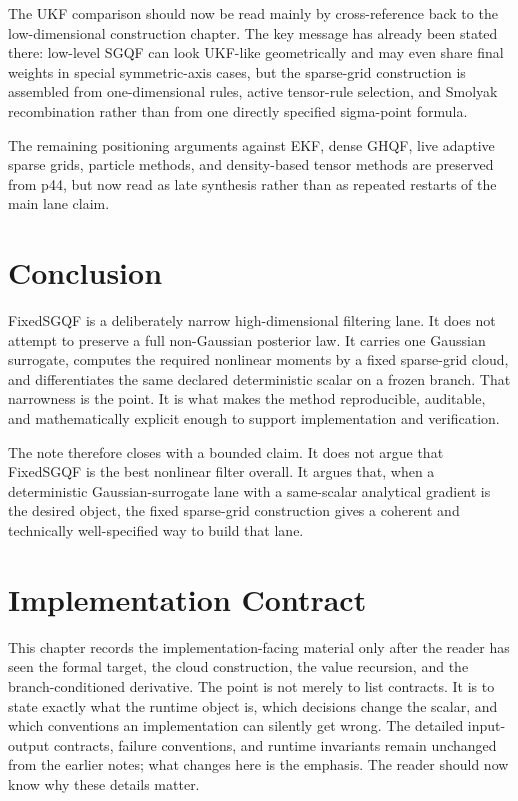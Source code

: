 \documentclass[11pt]{article}
\numberwithin{equation}{section}
\begin{document}
The UKF comparison should now be read mainly by cross-reference back to the
low-dimensional construction chapter.  The key message has already been stated
there: low-level SGQF can look UKF-like geometrically and may even share final
weights in special symmetric-axis cases, but the sparse-grid construction is
assembled from one-dimensional rules, active tensor-rule selection, and Smolyak
recombination rather than from one directly specified sigma-point formula.

The remaining positioning arguments against EKF, dense GHQF, live adaptive sparse
grids, particle methods, and density-based tensor methods are preserved from p44,
but now read as late synthesis rather than as repeated restarts of the main lane
claim.

\section{Conclusion}
\label{sec:p31-conclusion}

FixedSGQF is a deliberately narrow high-dimensional filtering lane.  It does not
attempt to preserve a full non-Gaussian posterior law.  It carries one Gaussian
surrogate, computes the required nonlinear moments by a fixed sparse-grid cloud,
and differentiates the same declared deterministic scalar on a frozen branch.
That narrowness is the point.  It is what makes the method reproducible,
auditable, and mathematically explicit enough to support implementation and
verification.

The note therefore closes with a bounded claim.  It does not argue that FixedSGQF
is the best nonlinear filter overall.  It argues that, when a deterministic
Gaussian-surrogate lane with a same-scalar analytical gradient is the desired
object, the fixed sparse-grid construction gives a coherent and technically
well-specified way to build that lane.

\appendix

\section{Implementation Contract}
\label{sec:p31-implementation-contract}

This chapter records the implementation-facing material only after the reader has
seen the formal target, the cloud construction, the value recursion, and the
branch-conditioned derivative.  The point is not merely to list contracts.  It is
to state exactly what the runtime object is, which decisions change the scalar,
and which conventions an implementation can silently get wrong.  The detailed
input-output contracts, failure conventions, and runtime invariants remain
unchanged from the earlier notes; what changes here is the emphasis.  The reader
should now know why these details matter.
\end{document}
